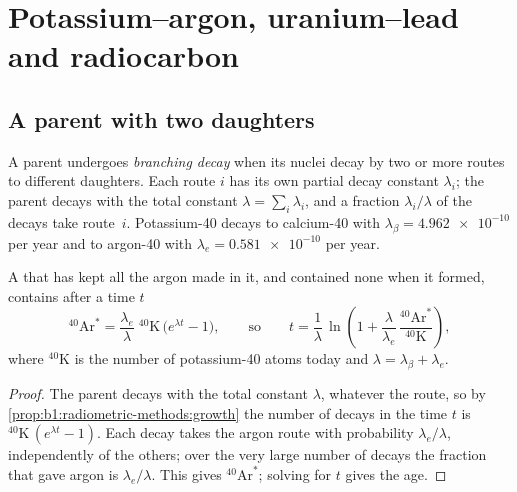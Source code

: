 \section{Potassium--argon, uranium--lead and radiocarbon}\label{sec:b1:radiometric-methods:kar}

\subsection*{A parent with two daughters}

\begin{definition}\label{def:b1:radiometric-methods:branching}
A parent undergoes \emph{branching decay} when its nuclei
decay by two or more routes to different daughters. Each route $i$ has its own
partial decay constant $\lambda_i$; the parent decays with the total constant
$\lambda = \sum_i \lambda_i$, and a fraction $\lambda_i/\lambda$ of the decays
take route~$i$. Potassium-40 decays to calcium-40 with $\lambda_\beta =
\num{4.962e-10}$ per year and to argon-40 with $\lambda_e = \num{0.581e-10}$ per
year.
\end{definition}

\begin{proposition}\label{prop:b1:radiometric-methods:kar}
A  that has kept all the argon made in it, and contained none when it
formed, contains after a time $t$
\[
  {}^{40}\mathrm{Ar}^* = \frac{\lambda_e}{\lambda}\;{}^{40}\mathrm{K}\,\bigl(e^{\lambda t} - 1\bigr),
  \qquad\text{so}\qquad
  t = \frac{1}{\lambda}\,\ln\!\left(1 + \frac{\lambda}{\lambda_e}\,
      \frac{{}^{40}\mathrm{Ar}^*}{{}^{40}\mathrm{K}}\right),
\]
where ${}^{40}\mathrm{K}$ is the number of potassium-40 atoms today and $\lambda =
\lambda_\beta + \lambda_e$.
\end{proposition}

\begin{proof}
The parent decays with the total constant $\lambda$, whatever the route, so by
\cref{prop:b1:radiometric-methods:growth} the number of decays in the time $t$ is
${}^{40}\mathrm{K}\,(e^{\lambda t} - 1)$. Each decay takes the argon route with
probability $\lambda_e/\lambda$, independently of the others; over the very
large number of decays the fraction that gave argon is $\lambda_e/\lambda$. This
gives ${}^{40}\mathrm{Ar}^*$; solving for $t$ gives the age.
\end{proof}

